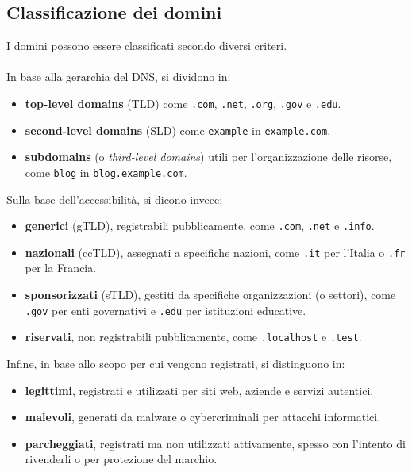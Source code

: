 \subsection*{Classificazione dei domini}
I domini possono essere classificati secondo diversi criteri.
\\\\
In base alla gerarchia del DNS, si dividono in: 
\begin{itemize}
    \item \textbf{top-level domains} (TLD) come \verb|.com|, \verb|.net|, \verb|.org|, \verb|.gov|
    e \verb|.edu|.
    \item \textbf{second-level domains} (SLD) come \verb|example| in \verb|example.com|.
    \item \textbf{subdomains} (o \textit{third-level domains}) utili per l'organizzazione 
    delle risorse, come \verb|blog| in \verb|blog.example.com|.
\end{itemize} 
Sulla base dell'accessibilità, si dicono invece:
\begin{itemize}
    \item \textbf{generici} (gTLD), registrabili pubblicamente, come \verb|.com|, \verb|.net| e \verb|.info|.
    \item  \textbf{nazionali} (ccTLD), assegnati a specifiche nazioni, come \verb|.it| per l'Italia o \verb|.fr| per la 
    Francia.
    \item \textbf{sponsorizzati} (sTLD), gestiti da specifiche organizzazioni (o settori), come 
    \verb|.gov| per enti governativi e \verb|.edu| per istituzioni educative.
    \item \textbf{riservati}, non registrabili pubblicamente, come \verb|.localhost| e \verb|.test|. 
\end{itemize} 
Infine, in base allo scopo per cui vengono registrati, si distinguono in:
\begin{itemize}
    \item \textbf{legittimi}, registrati e utilizzati per siti web, aziende e servizi autentici.
    \item \textbf{malevoli}, generati da malware o cybercriminali per attacchi informatici.
    \item \textbf{parcheggiati}, registrati ma non  utilizzati attivamente, spesso con l'intento di rivenderli o per 
    protezione del marchio.
\end{itemize}